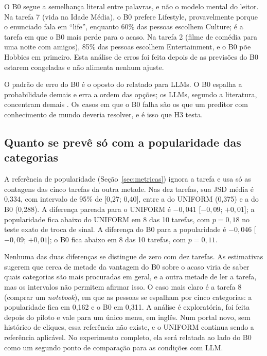 \documentclass[12pt,oneside,a4paper,chapter=TITLE,english,brazil]{abntex2}
\begin{document}
O B0 segue a semelhança literal entre palavras, e não o modelo mental do leitor. Na tarefa 7 (vida na Idade Média), o B0 prefere Lifestyle, provavelmente porque o enunciado fala em ``life'', enquanto 60\% das pessoas escolhem Culture; é a tarefa em que o B0 mais perde para o acaso. Na tarefa 2 (filme de comédia para uma noite com amigos), 85\% das pessoas escolhem Entertainment, e o B0 põe Hobbies em primeiro. Esta análise de erros foi feita depois de as previsões do B0 estarem congeladas e não alimenta nenhum ajuste.

O padrão de erro do B0 é o oposto do relatado para LLMs. O B0 espalha a probabilidade demais e erra a ordem das opções; os LLMs, segundo a literatura, concentram demais \cite{kuric2026wwgc}. Os casos em que o B0 falha são os que um preditor com conhecimento de mundo deveria resolver, e é isso que H3 testa.

\subsection{Quanto se prevê só com a popularidade das categorias}
\label{sec:popularidade}

\begin{real}
A referência de popularidade (Seção~\ref{sec:metricas}) ignora a tarefa e usa só as contagens das cinco tarefas da outra metade. Nas dez tarefas, sua JSD média é 0,334, com intervalo de 95\% de [0,27; 0,40], entre a do UNIFORM (0,375) e a do B0 (0,288). A diferença pareada para o UNIFORM é $-0{,}041$ [$-0{,}09$; $+0{,}01$]; a popularidade fica abaixo do UNIFORM em 8 das 10 tarefas, com $p=0{,}18$ no teste exato de troca de sinal. A diferença do B0 para a popularidade é $-0{,}046$ [$-0{,}09$; $+0{,}01$]; o B0 fica abaixo em 8 das 10 tarefas, com $p=0{,}11$.
\end{real}

Nenhuma das duas diferenças se distingue de zero com dez tarefas. As estimativas sugerem que cerca de metade da vantagem do B0 sobre o acaso viria de saber quais categorias são mais procuradas em geral, e a outra metade de ler a tarefa, mas os intervalos não permitem afirmar isso. O caso mais claro é a tarefa 8 (comprar um \textit{notebook}), em que as pessoas se espalham por cinco categorias: a popularidade fica em 0,162 e o B0 em 0,311. A análise é exploratória, foi feita depois do piloto e vale para um único menu, em inglês. Num portal novo, sem histórico de cliques, essa referência não existe, e o UNIFORM continua sendo a referência aplicável. No experimento completo, ela será relatada ao lado do B0 como um segundo ponto de comparação para as condições com LLM.
\end{document}
